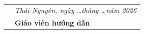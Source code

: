 \documentclass[../main.tex]{subfiles}
\begin{document}
\noindent\makebox[\textwidth]{\dotfill}

\vspace{0.35cm}
\noindent\makebox[\textwidth]{\dotfill}

\vspace{0.35cm}
\noindent\makebox[\textwidth]{\dotfill}

\vspace{0.35cm}
\noindent\makebox[\textwidth]{\dotfill}

\vspace{0.35cm}
\noindent\makebox[\textwidth]{\dotfill}

\vspace{0.35cm}
\noindent\makebox[\textwidth]{\dotfill}

\vspace{0.35cm}
\noindent\makebox[\textwidth]{\dotfill}

\vspace{0.35cm}
\noindent\makebox[\textwidth]{\dotfill}

\vspace{0.35cm}
\noindent\makebox[\textwidth]{\dotfill}

\vspace{0.35cm}
\noindent\makebox[\textwidth]{\dotfill}

\vspace{0.35cm}
\noindent\makebox[\textwidth]{\dotfill}

\vspace{0.35cm}
\noindent\makebox[\textwidth]{\dotfill}

\vspace{1.2cm}

\begin{tabular}{p{} >{\centering\arraybackslash}p{}}
	& \textit{Thái Nguyên, ngày \ldots tháng \ldots năm 2026} \\[0.5cm]
	& \textbf{Giáo viên hướng dẫn} \\[2cm]
\end{tabular}
\end{document}
